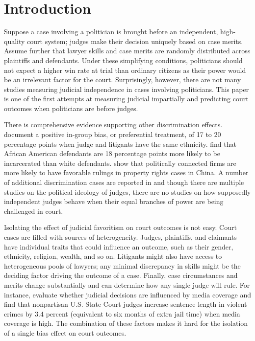 \documentclass[11pt]{article}
\begin{document}
\section{Introduction} \label{sec:introduction_paper2}

Suppose a case involving a politician is brought before an independent, high-quality court system; judges make their decision uniquely based on case merits. Assume further that lawyer skills and case merits are randomly distributed across plaintiffs and defendants. Under these simplifying conditions, politicians should not expect a higher win rate at trial than ordinary citizens as their power would be an irrelevant factor for the court. Surprisingly, however, there are not many studies measuring judicial independence in cases involving politicians. This paper is one of the first attempts at measuring judicial impartially and predicting court outcomes when politicians are before judges.

There is comprehensive evidence supporting other discrimination effects. \citet{ShayoJudicialIngroupBias2011} document a positive in-group bias, or preferential treatment, of 17 to 20 percentage points when judge and litigants have the same ethnicity. \citet{AbramsJudgesVaryTheir2012} find that African American defendants are 18 percentage points more likely to be incarcerated than white defendants. \citet{LuPoliticalConnectednessCourt2015} show that politically connected firms are more likely to have favorable rulings in property rights cases in China. A number of additional discrimination cases are reported in \citet{RachlinskiJudgingJudiciaryNumbers2017} and though there are multiple studies on the political ideology of judges, there are no studies on how supposedly independent judges behave when their equal branches of power are being challenged in court.

Isolating the effect of judicial favoritism on court outcomes is not easy. Court cases are filled with sources of heterogeneity. Judges, plaintiffs, and claimants have individual traits that could influence an outcome, such as their gender, ethnicity, religion, wealth, and so on. Litigants might also have access to heterogeneous pools of lawyers; any minimal discrepancy in skills might be the deciding factor driving the outcome of a case. Finally, case circumstances and merits change substantially and can determine how any single judge will rule. For instance, \citet{LimJudgePoliticianPress2015} evaluate whether judicial decisions are influenced by media coverage and find that nonpartisan U.S. State Court judges increase sentence length in violent crimes by 3.4 percent (equivalent to six months of extra jail time) when media coverage is high. The combination of these factors makes it hard for the isolation of a single bias effect on court outcomes.
\end{document}
